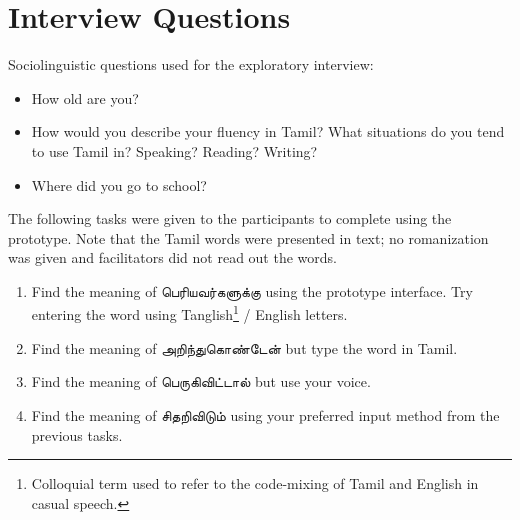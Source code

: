 \documentclass[11pt]{article}
\begin{document}
\section{Interview Questions} \label{sec:appendix-a}
Sociolinguistic questions used for the exploratory interview:
\begin{itemize}
  \item How old are you?
  \item How would you describe your fluency in Tamil? What situations do you tend to use Tamil in? Speaking? Reading? Writing?
  \item Where did you go to school? 
\end{itemize}
The following tasks were given to the participants to complete using the prototype. Note that the Tamil words were presented in text; no romanization was given and facilitators did not read out the words.\\
\begin{enumerate}
  \item Find the meaning of \foreignlanguage{tamil}{பெரியவர்களுக்கு} using the prototype interface. Try entering the word using Tanglish\footnote{Colloquial term used to refer to the code-mixing of Tamil and English in casual speech.} / English letters.
  \item Find the meaning of \newline \foreignlanguage{tamil}{அறிந்துகொண்டேன்} but type the word in Tamil.
  \item Find the meaning of \foreignlanguage{tamil}{பெருகிவிட்டால்} but use your voice. 
  \item Find the meaning of \foreignlanguage{tamil}{சிதறிவிடும்} using your preferred input method from the previous tasks.
\end{enumerate}
\end{document}
